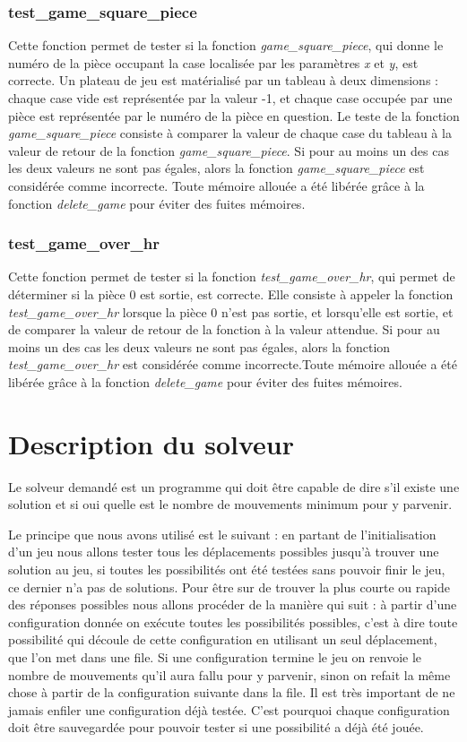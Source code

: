 \documentclass{report}
\begin{document}
\subsection{test\_game\_square\_piece}
Cette fonction permet de tester si la fonction \emph{game\_square\_piece}, qui donne le numéro de la pièce occupant la case localisée par les  paramètres \emph{x} et \emph{y}, est correcte. Un plateau de jeu est matérialisé par un tableau à deux dimensions : chaque case vide est représentée par la valeur -1, et chaque case occupée par une pièce est représentée par le numéro de la pièce en question. Le teste de la fonction \emph{game\_square\_piece} consiste à comparer la valeur de chaque case du tableau à la valeur de retour de la fonction \emph{game\_square\_piece}. Si pour au moins un des cas les deux valeurs ne sont pas égales, alors la fonction \emph{game\_square\_piece} est considérée comme incorrecte. Toute mémoire allouée a été libérée grâce à la fonction \emph{delete\_game} pour éviter des fuites mémoires.
\subsection{test\_game\_over\_hr}
Cette fonction permet de tester si la fonction \emph{test\_game\_over\_hr}, qui permet de déterminer si la pièce 0 est sortie, est correcte. Elle consiste à appeler la fonction \emph{test\_game\_over\_hr} lorsque la pièce 0 n'est pas sortie, et lorsqu'elle est sortie, et de comparer la valeur de retour de la fonction à la valeur attendue. Si pour au moins un des cas les deux valeurs ne sont pas égales, alors la fonction \emph{test\_game\_over\_hr} est considérée comme incorrecte.Toute mémoire allouée a été libérée grâce à la fonction \emph{delete\_game} pour éviter des fuites mémoires.

\chapter{Description du solveur}
Le solveur demandé est un programme qui doit être capable de dire s'il existe une solution et si oui quelle est le nombre de mouvements minimum pour y parvenir.

Le principe que nous avons utilisé est le suivant : en partant de l'initialisation d'un jeu nous allons tester tous les déplacements possibles jusqu'à trouver une solution au jeu, si toutes les possibilités ont été testées sans pouvoir finir le jeu, ce dernier n'a pas de solutions. Pour être sur de trouver la plus courte ou rapide des réponses possibles nous allons procéder de la manière qui suit : à partir d'une configuration donnée on exécute toutes les possibilités possibles, c'est à dire toute possibilité qui découle de cette configuration en utilisant un seul déplacement, que l'on met dans une file. Si une configuration termine le jeu on renvoie le nombre de mouvements qu'il aura fallu pour y parvenir, sinon on refait la même chose à partir de la configuration suivante dans la file. Il est très important de ne jamais enfiler une configuration déjà testée. C'est pourquoi chaque configuration doit être sauvegardée pour pouvoir tester si une possibilité a déjà été jouée.
\end{document}
